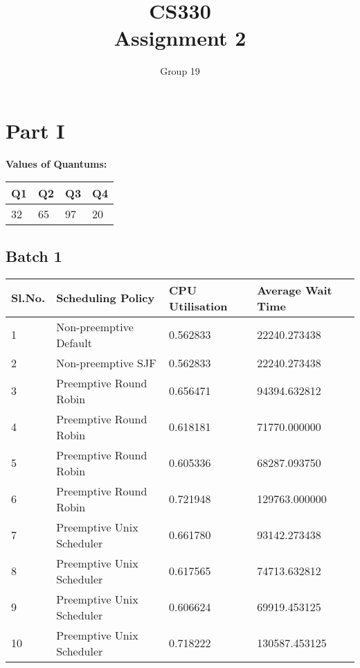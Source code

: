\documentclass{article}
\author{Group 19}
\title{CS330 \\ Assignment 2}
\date{}
\begin{document}
\maketitle
\section{Part I}
\textbf{Values of Quantums:}\\

    \begin{tabular}{| l | l | l | l |}
    \hline
    Q1 & Q2 & Q3 & Q4 \\ \hline
    32 & 65 & 97 & 20 \\
    \hline
    \end{tabular}


\subsection{Batch 1}
    \begin{center}
    \begin{tabular}{| l | l | l | l |}
    \hline
    Sl.No. & Scheduling Policy & CPU Utilisation & Average Wait Time \\ \hline
    1 & Non-preemptive Default & 0.562833 & 22240.273438 \\
    2 & Non-preemptive SJF & 0.562833 & 22240.273438 \\
    3 & Preemptive Round Robin & 0.656471 & 94394.632812 \\
    4 & Preemptive Round Robin & 0.618181 & 71770.000000 \\
    5 & Preemptive Round Robin & 0.605336 & 68287.093750 \\
    6 & Preemptive Round Robin & 0.721948 & 129763.000000 \\
    7 & Preemptive Unix Scheduler & 0.661780 & 93142.273438 \\
    8 & Preemptive Unix Scheduler & 0.617565 & 74713.632812 \\
    9 & Preemptive Unix Scheduler & 0.606624 & 69919.453125 \\
    10 & Preemptive Unix Scheduler & 0.718222 & 130587.453125 \\
    \hline
    \end{tabular}
    \end{center}
\end{document}

